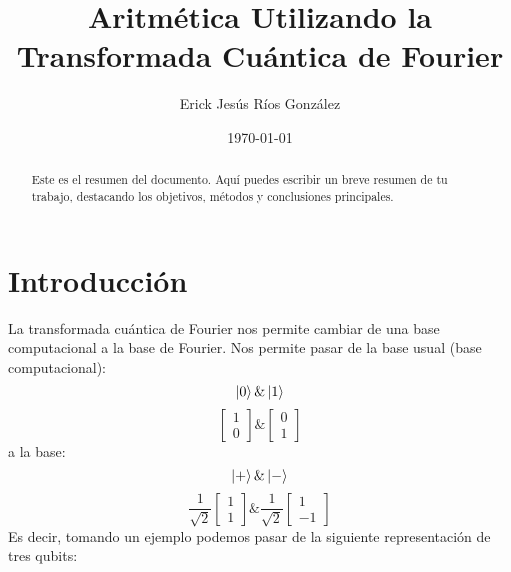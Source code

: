 \documentclass{article}
\title{Aritmética Utilizando la Transformada Cuántica de Fourier }
\author{Erick Jesús Ríos González}
\date{\today}
\begin{document}
\maketitle
\begin{abstract}
    Este es el resumen del documento. Aquí puedes escribir un breve resumen de tu trabajo, destacando los objetivos, métodos y conclusiones principales.
\end{abstract}
\section{Introducción}
La transformada cuántica de Fourier nos permite cambiar de una 
base computacional a la base de Fourier. Nos permite pasar de 
la base usual (base computacional):
\[\ket{0} \& \ket{1}\]
\[\begin{bmatrix}
    1 \\
    0
\end{bmatrix} \&
\begin{bmatrix}
    0\\
    1
\end{bmatrix}\]
a la base:
\[\ket{+} \& \ket{-}\]
\[\frac{1}{\sqrt{2}}\begin{bmatrix}
    1 \\
    1
\end{bmatrix} \&\frac{1}{\sqrt{2}}
\begin{bmatrix}
    1\\
    -1
\end{bmatrix}\]
Es decir, tomando un ejemplo
podemos pasar de la siguiente representación de tres qubits:
\end{document}
